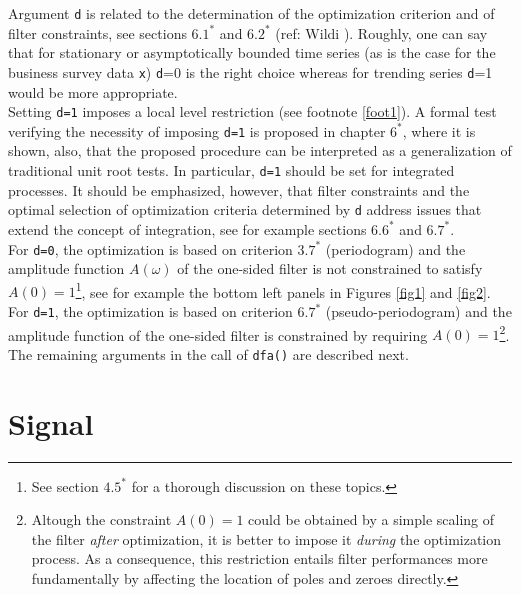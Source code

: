 \documentclass[a4paper]{article}
\begin{document}
Argument \texttt{d} is related to the determination of the
optimization criterion and of filter constraints, see sections $6.1^*$
and $6.2^*$ (ref: Wildi \cite{wildi2007}). Roughly, one can say that
for stationary or asymptotically bounded time series (as is the case
for the business survey data \texttt{x}) \texttt{d}=0 is the right
choice whereas for trending series \texttt{d}=1 would be more
appropriate. \\

Setting \texttt{d=1} imposes a local level restriction (see footnote
\ref{foot1}). A formal test verifying the necessity of imposing
\texttt{d=1} is proposed in chapter $6^*$, where it is shown, also,
that the proposed procedure can be interpreted as a generalization of
traditional unit root tests. In particular, \texttt{d=1} should be set
for integrated processes. It should be emphasized, however, that
filter constraints and the optimal selection of optimization criteria
determined by \texttt{d} address issues that extend the concept of
integration, see for example sections $6.6^*$ and $6.7^*$. \\

For \texttt{d=0}, the optimization is based on criterion $3.7^*$
(periodogram) and the amplitude function $A(\omega)$ of the one-sided
filter is not constrained to satisfy $A(0)=1$\footnote{See section
  $4.5^*$ for a thorough discussion on these topics.}, see for example
the bottom left panels in Figures \ref{fig1} and \ref{fig2}. For
\texttt{d=1}, the optimization is based on criterion $6.7^*$
(pseudo-periodogram) and the amplitude function of the one-sided
filter is constrained by requiring $A(0)=1$\footnote{Altough the
  constraint $A(0)=1$ could be obtained by a simple scaling of the
  filter \emph{after} optimization, it is better to impose it
  \emph{during} the optimization process. As a consequence, this
  restriction entails filter performances more fundamentally by
  affecting the location of poles and zeroes directly.}. \\

The remaining arguments in the call of \texttt{dfa()} are described
next. 


\section{Signal}\label{sect3}
\end{document}
